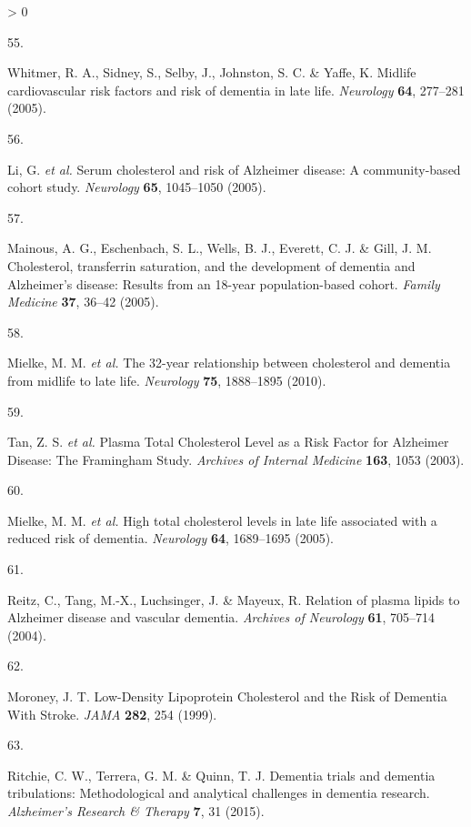\documentclass[a4paper, twoside]{templates/ociamthesis}
\newlength{\cslhangindent}
\newlength{\csllabelwidth}
\newenvironment{CSLReferences}[3] %
 {%
  \setlength{\parindent}{0pt}
  \ifodd #1 \everypar{\setlength{\hangindent}{\cslhangindent}}\ignorespaces\fi
  \ifnum #2 > 0
  \setlength{\parskip}{#2\baselineskip}
  \fi
 }%
 {}
\newcommand{\CSLLeftMargin}[1]{\parbox[t]{\maxof{\widthof{#1}}{\csllabelwidth}}{#1}}
\newcommand{\CSLRightInline}[1]{\parbox[t]{\linewidth - \csllabelwidth}{#1}}
\begin{document}
\begin{CSLReferences}{0}{0}
\leavevmode\hypertarget{ref-whitmer2005}{}%
\CSLLeftMargin{55. }
\CSLRightInline{Whitmer, R. A., Sidney, S., Selby, J., Johnston, S. C. \& Yaffe, K. Midlife cardiovascular risk factors and risk of dementia in late life. \emph{Neurology} \textbf{64}, 277--281 (2005).}

\leavevmode\hypertarget{ref-li2005}{}%
\CSLLeftMargin{56. }
\CSLRightInline{Li, G. \emph{et al.} Serum cholesterol and risk of {Alzheimer} disease: A community-based cohort study. \emph{Neurology} \textbf{65}, 1045--1050 (2005).}

\leavevmode\hypertarget{ref-mainous2005}{}%
\CSLLeftMargin{57. }
\CSLRightInline{Mainous, A. G., Eschenbach, S. L., Wells, B. J., Everett, C. J. \& Gill, J. M. Cholesterol, transferrin saturation, and the development of dementia and {Alzheimer}'s disease: Results from an 18-year population-based cohort. \emph{Family Medicine} \textbf{37}, 36--42 (2005).}

\leavevmode\hypertarget{ref-mielke2010}{}%
\CSLLeftMargin{58. }
\CSLRightInline{Mielke, M. M. \emph{et al.} The 32-year relationship between cholesterol and dementia from midlife to late life. \emph{Neurology} \textbf{75}, 1888--1895 (2010).}

\leavevmode\hypertarget{ref-tan2003}{}%
\CSLLeftMargin{59. }
\CSLRightInline{Tan, Z. S. \emph{et al.} Plasma {Total Cholesterol Level} as a {Risk Factor} for {Alzheimer Disease}: The {Framingham Study}. \emph{Archives of Internal Medicine} \textbf{163}, 1053 (2003).}

\leavevmode\hypertarget{ref-mielke2005}{}%
\CSLLeftMargin{60. }
\CSLRightInline{Mielke, M. M. \emph{et al.} High total cholesterol levels in late life associated with a reduced risk of dementia. \emph{Neurology} \textbf{64}, 1689--1695 (2005).}

\leavevmode\hypertarget{ref-reitz2004}{}%
\CSLLeftMargin{61. }
\CSLRightInline{Reitz, C., Tang, M.-X., Luchsinger, J. \& Mayeux, R. Relation of plasma lipids to {Alzheimer} disease and vascular dementia. \emph{Archives of Neurology} \textbf{61}, 705--714 (2004).}

\leavevmode\hypertarget{ref-moroney1999}{}%
\CSLLeftMargin{62. }
\CSLRightInline{Moroney, J. T. Low-{Density Lipoprotein Cholesterol} and the {Risk} of {Dementia With Stroke}. \emph{JAMA} \textbf{282}, 254 (1999).}

\leavevmode\hypertarget{ref-ritchie2015}{}%
\CSLLeftMargin{63. }
\CSLRightInline{Ritchie, C. W., Terrera, G. M. \& Quinn, T. J. Dementia trials and dementia tribulations: Methodological and analytical challenges in dementia research. \emph{Alzheimer's Research \& Therapy} \textbf{7}, 31 (2015).}


\end{CSLReferences}
\end{document}
